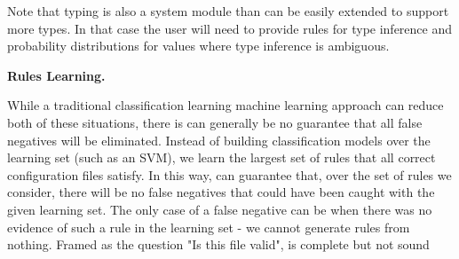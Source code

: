 Note that typing is also a system module than can be easily extended to support more types. 
In that case the user will need to provide rules for type inference and probability distributions for values where type inference is ambiguous.

{\bf {Rules Learning.}}

While a traditional classification learning machine learning approach can reduce both of these situations, there is can generally be no guarantee that all false negatives will be eliminated. Instead of building classification models over the learning set (such as an SVM), we learn the largest set of rules that all correct configuration files satisfy. In this way, \app can guarantee that, over the set of rules we consider, there will be no false negatives that could have been caught with the given learning set. The only case of a false negative can be when there was no evidence of such a rule in the learning set - we cannot generate rules from nothing. Framed as the question "Is this file valid", \app is complete but not sound